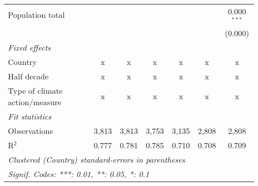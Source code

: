 \begin{tabular}{lcccccc}
   Population total                                  &                &                &                &                &                & 0.000$^{***}$\\   
                                                     &                &                &                &                &                & (0.000)\\   
   \emph{Fixed effects}\\
   Country                                           & x              & x              & x              & x              & x              & x\\  
   Half decade                                       & x              & x              & x              & x              & x              & x\\  
   Type of climate action/measure                    & x              & x              & x              & x              & x              & x\\  
   \midrule \emph{Fit statistics}\\
   Observations                                      & 3,813          & 3,813          & 3,753          & 3,135          & 2,808          & 2,808\\  
   R$^2$                                             & 0.777          & 0.781          & 0.785          & 0.710          & 0.708          & 0.709\\  
   \midrule
   \multicolumn{7}{l}{\emph{Clustered (Country) standard-errors in parentheses}}\\
   \multicolumn{7}{l}{\emph{Signif. Codes: ***: 0.01, **: 0.05, *: 0.1}}\\
\end{tabular}
\par\endgroup


